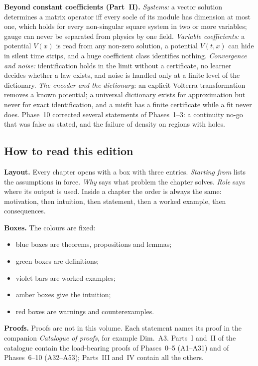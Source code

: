 \textbf{Beyond constant coefficients (Part~II).} \emph{Systems:} a vector solution determines a matrix operator iff every socle of its module has dimension at most one, which holds for every non-singular square system in two or more variables; gauge can never be separated from physics by one field. \emph{Variable coefficients:} a potential $V(x)$ is read from any non-zero solution, a potential $V(t,x)$ can hide in silent time strips, and a huge coefficient class identifies nothing. \emph{Convergence and noise:} identification holds in the limit without a certificate, no learner decides whether a law exists, and noise is handled only at a finite level of the dictionary. \emph{The encoder and the dictionary:} an explicit Volterra transformation removes a known potential; a universal dictionary exists for approximation but never for exact identification, and a misfit has a finite certificate while a fit never does. Phase~10 corrected several statements of Phases~1--3: a continuity no-go that was false as stated, and the failure of density on regions with holes.

\subsection*{How to read this edition}

\textbf{Layout.} Every chapter opens with a box with three entries. \emph{Starting from} lists the assumptions in force. \emph{Why} says what problem the chapter solves. \emph{Role} says where its output is used. Inside a chapter the order is always the same: motivation, then intuition, then statement, then a worked example, then consequences.

\textbf{Boxes.} The colours are fixed:
\begin{itemize}
\item blue boxes are theorems, propositions and lemmas;
\item green boxes are definitions;
\item violet bars are worked examples;
\item amber boxes give the intuition;
\item red boxes are warnings and counterexamples.
\end{itemize}

\textbf{Proofs.} Proofs are not in this volume. Each statement names its proof in the companion \emph{Catalogue of proofs}, for example \textsf{\footnotesize\color{cA}Dim.~A3}. Parts~I and~II of the catalogue contain the load-bearing proofs of Phases~0--5 (A1--A31) and of Phases~6--10 (A32--A53); Parts~III and~IV contain all the others.

